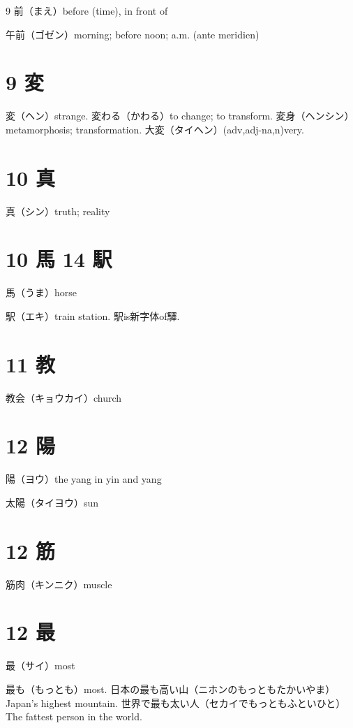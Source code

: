 9 前（まえ）before (time), in front of

午前（ゴゼン）morning; before noon; a.m. (ante meridien)

\section{9 変}

変（ヘン）strange.
変わる（かわる）to change; to transform.
変身（ヘンシン）metamorphosis; transformation.
大変（タイヘン）(adv,adj-na,n)very.

\section{10 真}

真（シン）truth; reality

\section{10 馬 14 駅}

馬（うま）horse

駅（エキ）train station. 駅is新字体of驛.

\section{11 教}

教会（キョウカイ）church

\section{12 陽}

陽（ヨウ）the yang in yin and yang

太陽（タイヨウ）sun

\section{12 筋}

筋肉（キンニク）muscle

\section{12 最}

最（サイ）most

最も（もっとも）most.
日本の最も高い山（ニホンのもっともたかいやま）Japan's highest mountain.
世界で最も太い人（セカイでもっともふといひと）The fattest person in the world.

